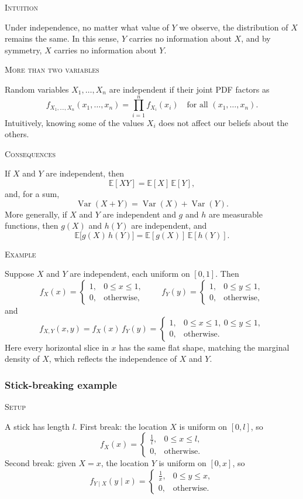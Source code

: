 \textsc{Intuition}

Under independence, no matter what value of \(Y\) we observe, the distribution of \(X\) remains the same.  
In this sense, \(Y\) carries no information about \(X\), and by symmetry, \(X\) carries no information about \(Y\).

\textsc{More than two variables}

Random variables \(X_1,\dots,X_n\) are independent if their joint PDF factors as
\[
f_{X_1,\dots,X_n}(x_1,\dots,x_n)
=
\prod_{i=1}^n f_{X_i}(x_i)
\quad\text{for all }(x_1,\dots,x_n).
\]
Intuitively, knowing some of the values \(X_i\) does not affect our beliefs about the others.

\textsc{Consequences}

If \(X\) and \(Y\) are independent, then
\[
\mathbb{E}[XY] = \mathbb{E}[X]\,\mathbb{E}[Y],
\]
and, for a sum,
\[
\operatorname{Var}(X+Y) = \operatorname{Var}(X) + \operatorname{Var}(Y).
\]
More generally, if \(X\) and \(Y\) are independent and \(g\) and \(h\) are measurable functions, then \(g(X)\) and \(h(Y)\) are independent, and
\[
\mathbb{E}\big[g(X)\,h(Y)\big]
=
\mathbb{E}[g(X)]\,\mathbb{E}[h(Y)].
\]

\textsc{Example}

Suppose \(X\) and \(Y\) are independent, each uniform on \([0,1]\).  
Then
\[
f_X(x) =
\begin{cases}
1, & 0 \le x \le 1,\\
0, & \text{otherwise},
\end{cases}
\qquad
f_Y(y) =
\begin{cases}
1, & 0 \le y \le 1,\\
0, & \text{otherwise},
\end{cases}
\]
and
\[
f_{X,Y}(x,y) = f_X(x)\,f_Y(y)
=
\begin{cases}
1, & 0 \le x \le 1,\ 0 \le y \le 1,\\
0, & \text{otherwise}.
\end{cases}
\]
Here every horizontal slice in \(x\) has the same flat shape, matching the marginal density of \(X\), which reflects the independence of \(X\) and \(Y\).


\subsubsection{Stick-breaking example}

\textsc{Setup}

A stick has length \(l\).  
First break: the location \(X\) is uniform on \([0,l]\), so
\[
f_X(x)
=
\begin{cases}
\frac{1}{l}, & 0 \le x \le l,\\
0, & \text{otherwise}.
\end{cases}
\]
Second break: given \(X=x\), the location \(Y\) is uniform on \([0,x]\), so
\[
f_{Y\mid X}(y\mid x)
=
\begin{cases}
\frac{1}{x}, & 0 \le y \le x,\\
0, & \text{otherwise}.
\end{cases}
\]


